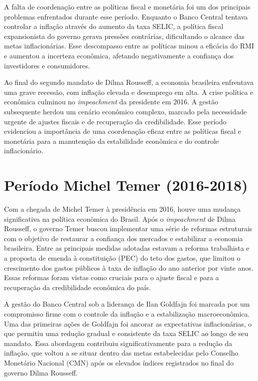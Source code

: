 \documentclass[12pt,oneside,a4paper,chapter=TITLE,english,brazil,sumario=abnt-6027-2012]{abntex2}
\begin{document}
A falta de coordenação entre as políticas fiscal e monetária foi um dos principais problemas enfrentados durante esse período. Enquanto o Banco Central tentava controlar a inflação através do aumento da taxa SELIC, a política fiscal expansionista do governo gerava pressões contrárias, dificultando o alcance das metas inflacionárias. Esse descompasso entre as políticas minou a eficácia do RMI e aumentou a incerteza econômica, afetando negativamente a confiança dos investidores e consumidores.

Ao final do segundo mandato de Dilma Rousseff, a economia brasileira enfrentava uma grave recessão, com inflação elevada e desemprego em alta. A crise política e econômica culminou no \textit{impeachment} da presidente em 2016. A gestão subsequente herdou um cenário econômico complexo, marcado pela necessidade urgente de ajustes fiscais e de recuperação da credibilidade. Esse período evidenciou a importância de uma coordenação eficaz entre as políticas fiscal e monetária para a manutenção da estabilidade econômica e do controle inflacionário.

\section{Período Michel Temer (2016-2018)}

Com a chegada de Michel Temer à presidência em 2016, houve uma mudança significativa na política econômica do Brasil. Após o \textit{impeachment} de Dilma Rousseff, o governo Temer buscou implementar uma série de reformas estruturais com o objetivo de restaurar a confiança dos mercados e estabilizar a economia brasileira. Entre as principais medidas adotadas estavam a reforma trabalhista e a  proposta de emenda à constituição (PEC) do teto dos gastos, que limitou o crescimento dos gastos públicos à taxa de inflação do ano anterior por vinte anos. Essas reformas foram vistas como cruciais para o ajuste fiscal e para a recuperação da credibilidade econômica do país.

A gestão do Banco Central sob a liderança de Ilan Goldfajn foi marcada por um compromisso firme com o controle da inflação e a estabilização macroeconômica. Uma das primeiras ações de Goldfajn foi ancorar as expectativas inflacionárias, o que permitiu uma redução gradual e consistente da taxa SELIC ao longo de seu mandato. Essa abordagem contribuiu significativamente para a redução da inflação, que voltou a se situar dentro das metas estabelecidas pelo Conselho Monetário Nacional (CMN) após os elevados índices registrados no final do governo Dilma Rousseff.
\end{document}
